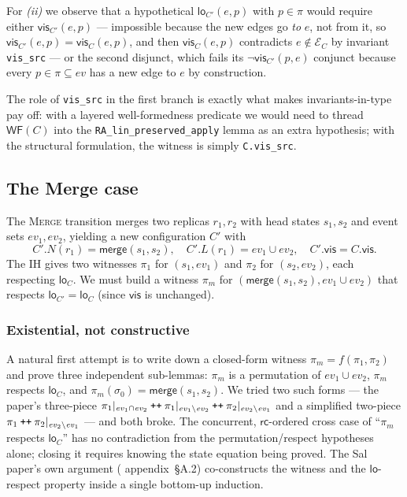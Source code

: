 \documentclass[11pt,a4paper]{article}
\theoremstyle{definition}
\theoremstyle{remark}
\newcommand{\mmerge}{\mathsf{merge}}
\newcommand{\mrc}{\mathsf{rc}}
\newcommand{\mvis}{\mathsf{vis}}
\newcommand{\mlo}{\mathsf{lo}}
\newcommand{\ev}{\mathit{ev}}
\newcommand{\evs}{\mathcal{E}}
\newcommand{\init}{\sigma_0}
\newcommand{\wellformed}{\mathsf{WF}}
\begin{document}
For \emph{(ii)} we observe that a hypothetical $\mlo_{C'}(e, p)$ with
$p \in \pi$ would require either $\mvis_{C'}(e, p)$ --- impossible
because the new edges go \emph{to} $e$, not from it, so
$\mvis_{C'}(e, p) = \mvis_C(e, p)$, and then $\mvis_C(e, p)$
contradicts $e \notin \evs_C$ by invariant \texttt{vis\_src} --- or
the second disjunct, which fails its $\neg\mvis_{C'}(p, e)$ conjunct
because every $p \in \pi \subseteq \ev$ has a new edge to $e$ by
construction.

The role of \texttt{vis\_src} in the first branch is exactly what
makes invariants-in-type pay off: with a layered well-formedness
predicate we would need to thread $\wellformed(C)$ into the
\texttt{RA\_lin\_preserved\_apply} lemma as an extra hypothesis;
with the structural formulation, the witness is simply
\texttt{C.vis\_src}.

\subsection{The Merge case}
\label{sec:bridge-merge}

The \textsc{Merge} transition merges two replicas $r_1, r_2$ with
head states $s_1, s_2$ and event sets $\ev_1, \ev_2$, yielding a new
configuration $C'$ with
\[
  C'.N(r_1) = \mmerge(s_1, s_2), \quad C'.L(r_1) = \ev_1 \cup \ev_2, \quad C'.\mvis = C.\mvis.
\]
The IH gives two witnesses $\pi_1$ for $(s_1, \ev_1)$ and $\pi_2$
for $(s_2, \ev_2)$, each respecting $\mlo_C$. We must build a
witness $\pi_m$ for $(\mmerge(s_1, s_2), \ev_1 \cup \ev_2)$ that
respects $\mlo_{C'} = \mlo_C$ (since $\mvis$ is unchanged).

\subsubsection{Existential, not constructive}
\label{sec:merge-existential}

A natural first attempt is to write down a closed-form witness
$\pi_m = f(\pi_1, \pi_2)$ and prove three independent
sub-lemmas: $\pi_m$ is a permutation of $\ev_1 \cup \ev_2$,
$\pi_m$ respects $\mlo_C$, and
$\pi_m(\init) = \mmerge(s_1, s_2)$. We tried two such forms ---
the paper's three-piece
$\pi_1|_{\ev_1 \cap \ev_2} \mathbin{\text{\tt ++}} \pi_1|_{\ev_1 \setminus \ev_2} \mathbin{\text{\tt ++}} \pi_2|_{\ev_2 \setminus \ev_1}$
and a simplified two-piece
$\pi_1 \mathbin{\text{\tt ++}} \pi_2|_{\ev_2 \setminus \ev_1}$
--- and both broke. The concurrent, $\mrc$-ordered cross case of
``$\pi_m$ respects $\mlo_C$'' has no contradiction from the
permutation/respect hypotheses alone; closing it requires knowing
the state equation being proved. The Sal paper's own argument
(\cite{sal2025} appendix~§A.2) co-constructs the witness and the
$\mlo$-respect property inside a single bottom-up induction.
\end{document}
